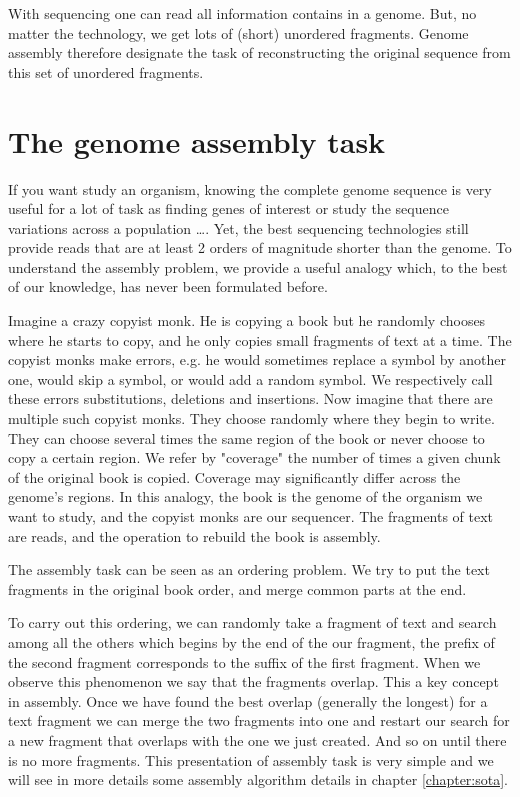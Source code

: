 \documentclass[./main.tex]{subfiles}
\begin{document}

With sequencing one can read all information contains in a genome. But, no matter the technology, we get lots of (short) unordered fragments. Genome assembly therefore designate the task of reconstructing the original sequence from this set of unordered fragments.%

\section{The genome assembly task}

If you want study an organism, knowing the complete genome sequence is very useful for a lot of task as finding 
genes of interest or study the sequence variations across a population \ldots.%
Yet, the best sequencing technologies still provide reads that are at least 2 orders of magnitude shorter than the genome. To understand the assembly problem, we provide a useful analogy which, to the best of our knowledge, has never been formulated before.

Imagine a crazy copyist monk. He is copying a book but he randomly chooses where he starts to copy, and he only copies small fragments of text at a time.
The copyist monks make errors, e.g. he would sometimes replace a symbol by another one, would skip a symbol, or would add a random symbol. We respectively call these errors substitutions, deletions and insertions.
Now imagine that there are multiple such copyist monks.
They choose randomly where they begin to write. They can choose several times the same region of the book or never choose to copy a certain region.
We refer by "coverage" the number of times a given chunk of the original book is copied. Coverage may significantly differ across the genome's regions.%
In this analogy, the book is the genome of the organism we want to study, and the copyist monks are our sequencer. The fragments of text are reads, and the operation to rebuild the book is assembly.

The assembly task can be seen as an ordering problem.%
We try to put the text fragments in the original book order, and merge common parts at the end.%

To carry out this ordering, we can randomly take a fragment of text and search among all the others which begins by the end of the our fragment, the prefix of the second fragment corresponds to the suffix of the first fragment. When we observe this phenomenon we say that the fragments overlap. This a key concept in assembly. Once we have found the best overlap (generally the longest) for a text fragment we can merge the two fragments into one and restart our search for a new fragment that overlaps with the one we just created. And so on until there is no more fragments. This presentation of assembly task is very simple and we will see in more details some assembly algorithm details in chapter \ref{chapter:sota}.
\end{document}
